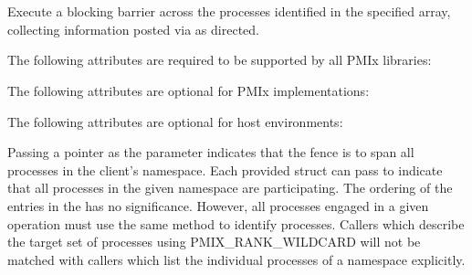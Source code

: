 \section{}

\summary

Execute a blocking barrier across the processes identified in the specified array, collecting information posted via  as directed.

\format


\begin{arglist}
\end{arglist}

\returnsimple

\reqattrstart
The following attributes are required to be supported by all \ac{PMIx} libraries:


\reqattrend

\optattrstart
The following attributes are optional for \ac{PMIx} implementations:



The following attributes are optional for host environments:


\optattrend

\descr

Passing a  pointer as the  parameter indicates that the fence is to span all processes in the client's namespace.
Each provided  struct can pass  to indicate that all processes in the given namespace are participating.
The ordering of the entries in the  has no significance.  However, all processes engaged in a given
operation must use the same method to identify processes.  Callers which describe
the target set of processes using PMIX_RANK_WILDCARD will not be matched with
callers which list the individual processes of a namespace explicitly.

